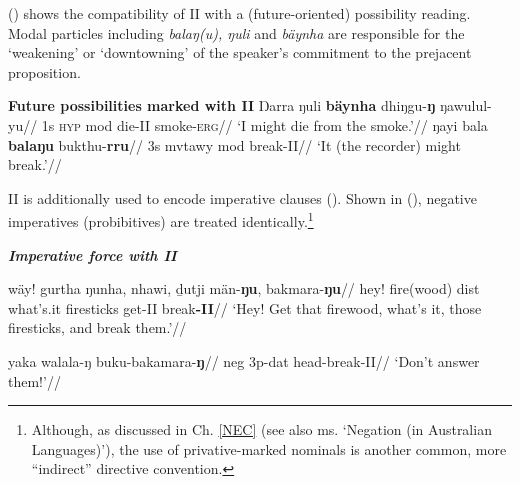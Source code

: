 () shows the compatibility of \gls{II} with a (future-oriented) possibility reading. Modal particles including \textit{balaŋ(u), ŋuli} and \textit{bäynha} are responsible for the `weakening' or `downtowning' of the speaker's commitment to the prejacent proposition. 

\pex\textbf{Future possibilities marked with \gls{II}}
\a{}\begingl\gla Ŋarra ŋuli \textbf{bäynha} dhiŋgu-\textbf{ŋ} ŋawulul-yu//
\glb 1s \textsc{hyp} \gls{mod} die-\gls{II} smoke-\textsc{erg}//
\glft`I might die from the smoke.'//\endgl
\a\begingl\gla ŋayi bala \textbf{balaŋu} bukthu-\textbf{rru}//
\glb 3s \gls{mvtawy} \gls{mod} break-\gls{II}//
\glft`It (the recorder) might break.'\trailingcitation{[DhG~20190417]}//\endgl
\xe



\gls{II} is additionally used to encode imperative clauses (). Shown in (), negative imperatives (probibitives) are treated identically.\footnote{Although, as discussed in Ch. \ref{NEC} (see also \citeauthor{Phillips2021b} ms. `Negation (in Australian Languages)'), the use of privative-marked nominals is another common, more ``indirect'' directive convention.}

\pex\textit{\textbf{Imperative force with \gls{II}}}

\a\begingl\gla wäy! gurtha ŋunha, nhawi, ḏutji män-\textbf{ŋu}, bakmara-\textbf{ŋu}//
\glb hey! fire(wood) \gls{dist} what's.it firesticks get-\gls{II} break\textbf{-II}//
\glft`Hey! Get that firewood, what's it, those firesticks, and break them.'//\endgl

\a{}\begingl\gla yaka walala-ŋ buku-bakamara-\textbf{ŋ}//
\glb \gls{neg} 3p-\gls{dat} head-break-\gls{II}//
\glft `Don't answer them!'//\endgl


